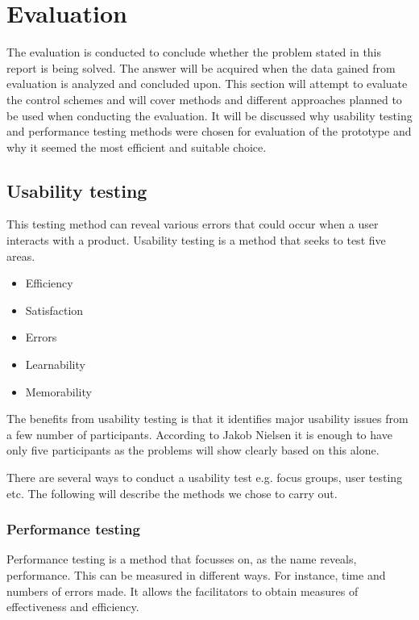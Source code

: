 \section{Evaluation}
The evaluation is conducted to conclude whether the problem stated in this report is being solved. The answer will be acquired when the data gained from evaluation is analyzed and concluded upon.
This section will attempt to evaluate the control schemes and will cover methods and different approaches planned to be used when conducting the evaluation. 
It will be discussed why usability testing and performance testing methods were chosen for evaluation of the prototype and why it seemed the most efficient and suitable choice.%

\subsection{Usability testing}

This testing method can reveal various errors that could occur when a user interacts with a product.
Usability testing is a method that seeks to test five areas. \cite{usability}

\begin{itemize}
\item Efficiency
\item Satisfaction
\item Errors
\item Learnability
\item Memorability
\end{itemize}

The benefits from usability testing is that it identifies major usability issues from a few number of participants. \cite{usability}
According to Jakob Nielsen it is enough to have only five participants as the problems will show clearly based on this alone. \cite{usability}

There are several ways to conduct a usability test e.g. focus groups, user testing etc.
The following will describe the methods we chose to carry out.

\subsubsection{Performance testing}

Performance testing is a method that focusses on, as the name reveals, performance. This can be measured in different ways. For instance, time and numbers of errors made.
It allows the facilitators to obtain measures of effectiveness and efficiency. \cite{performance}

